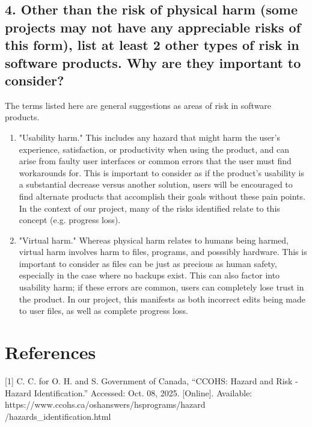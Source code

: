 \documentclass{article}
\begin{document}
\subsection*{4. Other than the risk of physical harm (some projects may not have any
appreciable risks of this form), list at least 2 other types of risk in
software products. Why are they important to consider?}
The terms listed here are general suggestions as areas of risk in software products.
\begin{enumerate}
    \item "Usability harm." This includes any hazard that might harm the user's experience, satisfaction, or productivity when using the product, and can arise from faulty user interfaces or common errors that the user must find workarounds for. This is important to consider as if the product's usability is a substantial decrease versus another solution, users will be encouraged to find alternate products that accomplish their goals without these pain points. In the context of our project, many of the risks identified relate to this concept (e.g. progress loss).
    \item "Virtual harm." Whereas physical harm relates to humans being harmed, virtual harm involves harm to files, programs, and posssibly hardware. This is important to consider as files can be just as precious as human safety, especially in the case where no backups exist. This can also factor into usability harm; if these errors are common, users can completely lose trust in the product. In our project, this manifests as both incorrect edits being made to user files, as well as complete progress loss.
\end{enumerate}


\section*{References}

[1]  C. C. for O. H. and S. Government of Canada, “CCOHS: Hazard and Risk - Hazard Identification.”
Accessed: Oct. 08, 2025. [Online]. Available: https://www.ccohs.ca/oshanswers/hsprograms/hazard
/hazards\_identification.html
\end{document}
